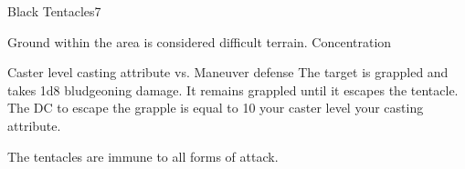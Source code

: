 \begin{spellsection}{Black Tentacles}{7}
\begin{spellheader}
\end{spellheader}
\begin{spellcontent}
    \begin{spelltargetinginfo}
    \end{spelltargetinginfo}
    \begin{spelleffects}
        \spelleffect Ground within the area is considered difficult terrain.
        \spelldur Concentration
    \end{spelleffects}
\end{spellcontent}
\begin{spellsubcontent}
    \begin{spelltargetinginfo}
    \end{spelltargetinginfo}
    \begin{spelleffects}
        \begin{spellattack}{Caster level \add casting attribute vs. Maneuver defense}
            \spellsuccess The target is grappled and takes 1d8 bludgeoning damage. It remains grappled until it escapes the tentacle. The DC to escape the grapple is equal to 10 \add your caster level \add your casting attribute.
        \end{spellattack}
    \end{spelleffects}
\end{spellsubcontent}
\begin{spellfooter}
    \spellnotes The tentacles are immune to all forms of attack.
\end{spellfooter}
\end{spellsection}

